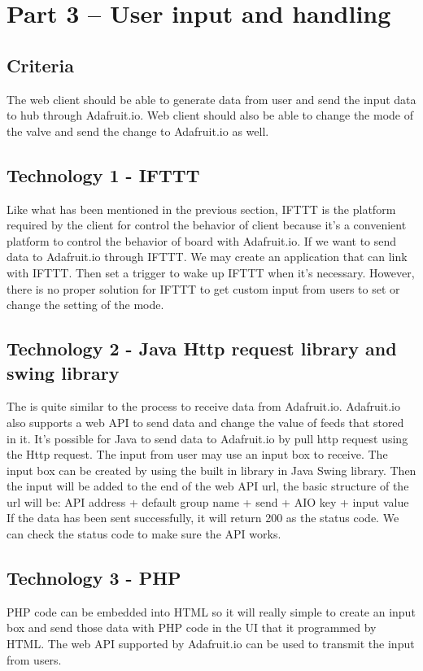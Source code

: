 \documentclass[10pt,onecolumn,journal,draftclsnofoot]{IEEEtran}
\begin{document}
    \section{Part 3 – User input and handling}
	\subsection{Criteria}
	\par 
	The web client should be able to generate data from user and send the input data to hub through Adafruit.io. Web client should also be able to change the mode of the valve and send the change to Adafruit.io as well.
	
	\subsection{Technology 1 - IFTTT}
	\par
	Like what has been mentioned in the previous section, IFTTT is the platform required by the client for control the behavior of client because it’s a convenient platform to control the behavior of board with Adafruit.io. If we want to send data to Adafruit.io through IFTTT. We may create an application that can link with IFTTT. Then set a trigger to wake up IFTTT when it’s necessary. However, there is no proper solution for IFTTT to get custom input from users to set or change the setting of the mode. 
    \subsection{Technology 2 - Java Http request library and swing library }
	\par 
	The is quite similar to the process to receive data from Adafruit.io. Adafruit.io also supports a web API to send data and change the value of feeds that stored in it. It’s possible for Java to send data to Adafruit.io by pull http request using the Http request. The input from user may use an input box to receive. The input box can be created by using the built in library in Java Swing library. Then the input will be added to the end of the web API url, the basic structure of the url will be:
	  API address + default group name + send + AIO key + input value     
	If the data has been sent successfully, it will return 200 as the status code. We can check the status code to make sure the API works.

	\subsection{Technology 3 - PHP}
    \par 
  	PHP code can be embedded into HTML so it will really simple to create an input box and send those data with PHP code in the UI that it programmed by HTML. The web API supported by Adafruit.io can be used to transmit the input from users.
\end{document}
